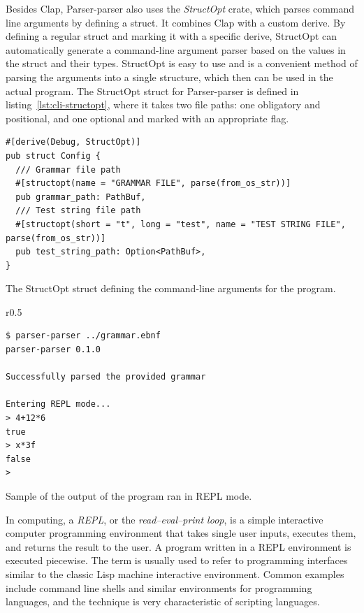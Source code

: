 \documentclass[english,engineering]{wizthesis}
\newcommand{\thisproject}{Parser-parser}
\begin{document}
Besides Clap, \thisproject{} also uses the \emph{StructOpt} crate, which parses
command line arguments by defining a struct. It combines Clap with a custom
derive. By defining a regular struct and marking it with a specific derive,
StructOpt can automatically generate a command-line argument parser based on the
values in the struct and their types. StructOpt is easy to use and is a
convenient method of parsing the arguments into a single structure, which then
can be used in the actual program. The StructOpt struct for \thisproject{} is
defined in listing~\ref{lst:cli-structopt}, where it takes two file paths: one
obligatory and positional, and one optional and marked with an appropriate flag.

\begin{listing}[H]
  \begin{verbatim}
#[derive(Debug, StructOpt)]
pub struct Config {
  /// Grammar file path
  #[structopt(name = "GRAMMAR FILE", parse(from_os_str))]
  pub grammar_path: PathBuf,
  /// Test string file path
  #[structopt(short = "t", long = "test", name = "TEST STRING FILE", parse(from_os_str))]
  pub test_string_path: Option<PathBuf>,
}
  \end{verbatim}
  \caption{The StructOpt struct defining the command-line arguments for the
  program.}
  \label{lst:cli-structopt}
\end{listing}

\begin{wraplisting}{r}{0.5\textwidth}
  \begin{verbatim}
$ parser-parser ../grammar.ebnf
parser-parser 0.1.0

Successfully parsed the provided grammar

Entering REPL mode...
> 4+12*6
true
> x*3f
false
>
  \end{verbatim}
  \caption{Sample of the output of the program ran in REPL mode.}
  \label{lst:cli-repl}
\end{wraplisting}

In computing, a \emph{REPL}, or the \emph{read–eval–print loop}, is a simple
interactive computer programming environment that takes single user inputs,
executes them, and returns the result to the user. A program written in a REPL
environment is executed piecewise. The term is usually used to refer to
programming interfaces similar to the classic Lisp machine interactive
environment. Common examples include command line shells and similar
environments for programming languages, and the technique is very characteristic
of scripting languages.
\end{document}
